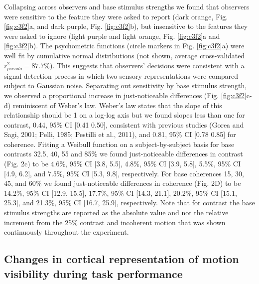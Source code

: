 Collapsing across observers and base stimulus strengths we found that observers were sensitive to the feature they were asked to report (dark orange, Fig. \ref{fig:c3f2}a, and dark purple, Fig. \ref{fig:c3f2}b), but insensitive to the features they were asked to ignore (light purple and light orange, Fig. \ref{fig:c3f2}a and \ref{fig:c3f2}b). The psychometric functions (circle markers in Fig. \ref{fig:c3f2}a) were well fit by cumulative normal distributions (not shown, average cross-validated $r_{pseudo}^2=87.7$\%). This suggests that observers’ decisions were consistent with a signal detection process in which two sensory representations were compared subject to Gaussian noise. Separating out sensitivity by base stimulus strength, we observed a proportional increase in just-noticeable differences (Fig. \ref{fig:c3f2}c-d) reminiscent of Weber's law. Weber’s law states that the slope of this relationship should be 1 on a log-log axis but we found slopes less than one for contrast, 0.44, 95\% CI [0.41 0.50], consistent with previous studies (Gorea and Sagi, 2001; Pelli, 1985; Pestilli et al., 2011), and 0.81, 95\% CI [0.78 0.85] for coherence. Fitting a Weibull function on a subject-by-subject basis for base contrasts 32.5, 40, 55 and 85\% we found just-noticeable differences in contrast (Fig. 2c) to be 4.6\%, 95\% CI [3.8, 5.5], 4.8\%, 95\% CI [3.9, 5.8], 5.5\%, 95\% CI [4.9, 6.2], and 7.5\%, 95\% CI [5.3, 9.8], respectively. For base coherences 15, 30, 45, and 60\% we found just-noticeable differences in coherence (Fig. 2D) to be 14.2\%, 95\% CI [12.9, 15.5], 17.7\%, 95\% CI [14.3, 21.1], 20.2\%, 95\% CI [15.1, 25.3], and 21.3\%, 95\% CI [16.7, 25.9], respectively. Note that for contrast the base stimulus strengths are reported as the absolute value and not the relative increment from the 25\% contrast and incoherent motion that was shown continuously throughout the experiment.

\subsection{Changes in cortical representation of motion visibility during task performance}

